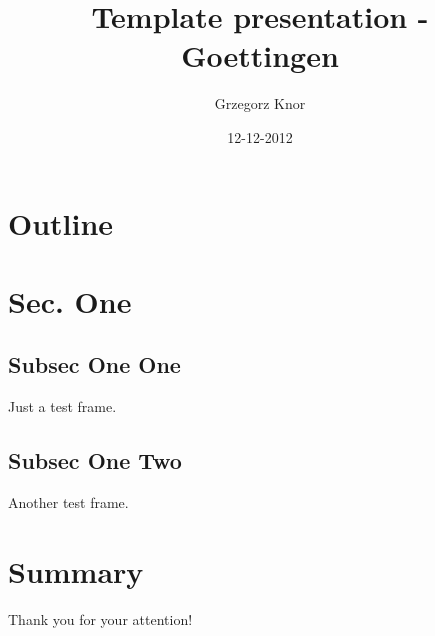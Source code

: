 \documentclass{beamer}
\title{Template presentation - Goettingen}
\author{Grzegorz Knor}
\date{12-12-2012}
\begin{document}
\begin{frame}
\titlepage
\end{frame}
\section*{Outline}
\begin{frame}
\tableofcontents
\end{frame}
\section{Sec. One}
\subsection{Subsec One One}
\begin{frame}
Just a test frame.
\end{frame}
\subsection{Subsec One Two}
\begin{frame}
Another test frame.
\end{frame}
\section{Summary}
\begin{frame}
Thank you for your attention!
\end{frame}
\end{document}
